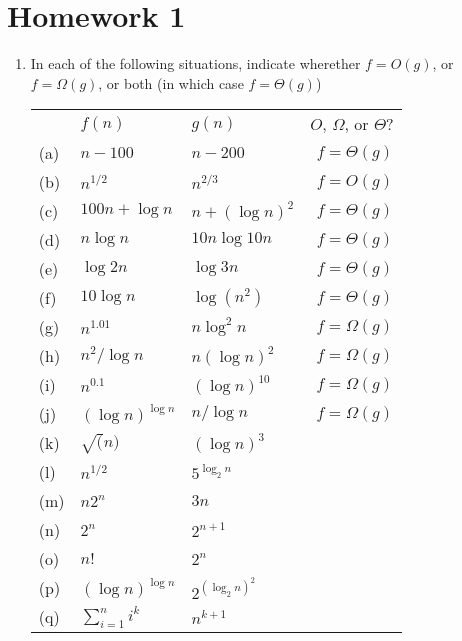 \documentclass[a4paper,12pt]{article}
\begin{document}
\section*{Homework 1}

\begin{enumerate}
    \item In each of the following situations, indicate wherether $f = O(g)$, or $f = \Omega(g)$, or both (in which case $f = \Theta(g)$)

    \begin{tabular}{lll|r}
      ~ & $f(n)$ & $g(n)$ & $O$, $\Omega$, or $\Theta$?\\
      (a) & $n - 100$ & $n - 200$ & $f = \Theta(g)$ \\
      (b) & $n^{1/2}$ & $n^{2/3}$ & $f = O(g)$\\
      (c) & $100n + \log n$ & $n + (\log n)^2$& $f = \Theta(g)$ \\
      (d) & $n \log n $ & $10n \log 10n$ & $f = \Theta(g)$\\
      (e) & $\log 2n$ & $\log 3n$ & $f = \Theta(g)$ \\
      (f) & $10 \log n$ & $\log(n^2)$ & $f = \Theta(g)$ \\
      (g) & $n^{1.01}$ & $n \log^2 n$ & $f = \Omega(g)$\\
      (h) & $n^2 / \log n$ & $n(\log n)^2$ & $f = \Omega(g)$\\
      (i) & $n^{0.1}$ & $(\log n)^{10}$ & $f = \Omega(g)$\\
      (j) & $(\log n)^{\log n}$ & $n / \log n$ & $f = \Omega(g)$\\
      (k) & $\sqrt(n)$ & $(\log n)^3$ \\
      (l) & $n^{1/2}$ & $5^{\log_2 n}$ \\
      (m) & $n2^n$ & $3n$ \\
      (n) & $2^n$ & $2^{n+1}$ \\
      (o) & $n!$ & $2^n$ \\
      (p) & $(\log n)^{\log n}$ & $2^{(\log_2 n)^2}$ \\
      (q) & $\sum_{i = 1}^n i^k$ & $n^{k+1}$ \\
    \end{tabular}
\end{enumerate}
\end{document}
